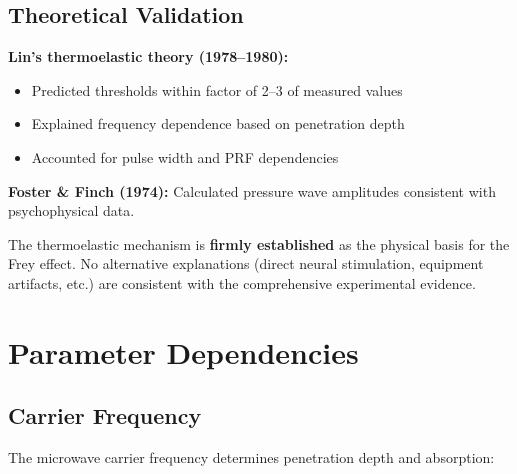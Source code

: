 \subsection{Theoretical Validation}

\textbf{Lin's thermoelastic theory (1978--1980):}
\begin{itemize}
\item Predicted thresholds within factor of 2--3 of measured values
\item Explained frequency dependence based on penetration depth
\item Accounted for pulse width and PRF dependencies
\end{itemize}

\textbf{Foster \& Finch (1974):} Calculated pressure wave amplitudes consistent with psychophysical data.

\begin{keyconcept}
The thermoelastic mechanism is \textbf{firmly established} as the physical basis for the Frey effect. No alternative explanations (direct neural stimulation, equipment artifacts, etc.) are consistent with the comprehensive experimental evidence.
\end{keyconcept}

\section{Parameter Dependencies}

\subsection{Carrier Frequency}

The microwave carrier frequency determines penetration depth and absorption:

\begin{center}
\end{center}

